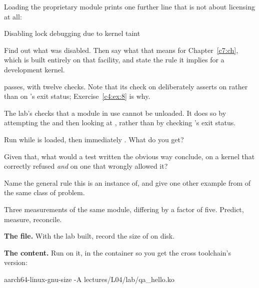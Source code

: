  Loading the proprietary module prints one further line that is not about licensing at all:

\begin{console}
Disabling lock debugging due to kernel taint
\end{console}

\noindent Find out what was disabled. Then say what that means for Chapter~\ref{c7:ch}, which is
built entirely on that facility, and state the rule it implies for a development kernel.

\checkyourself {} passes, with twelve checks. Note that its check on
 deliberately asserts on  rather than on 's exit status;
Exercise~\ref{c4:ex:8} is why.

\label{c4:ex:8}

The lab's  checks that a module in use cannot be unloaded. It does so by attempting the
 and then looking at , rather than by checking 's exit status.

 Run  while  is loaded, then immediately . What do you get?

 Given that, what would a test written the obvious way conclude, on a kernel that correctly
refused \emph{and} on one that wrongly allowed it?

 Name the general rule this is an instance of, and give one other example from
 of the same class of problem.

\label{c4:ex:9}

Three measurements of the same module, differing by a factor of five. Predict, measure, reconcile.

 \textbf{The file.} With the lab built, record the size of  on disk.

 \textbf{The content.} Run  on it, in the container so you get the cross
toolchain's version:

\begin{shell}
aarch64-linux-gnu-size -A lectures/L04/lab/qa_hello.ko
\end{shell}

